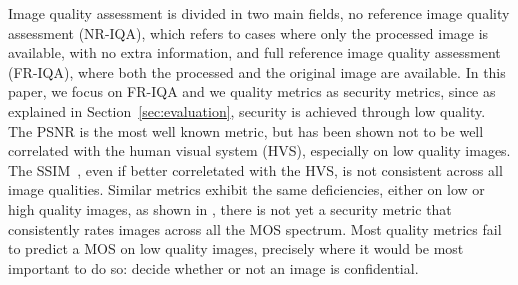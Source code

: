\documentclass{article}
\begin{document}
Image quality assessment is divided in two main fields, no reference image quality assessment (NR-IQA), which refers to cases where only the processed image is available, with no extra information, and full reference image quality assessment (FR-IQA), where both the processed and the original image are available. In this paper, we focus on FR-IQA and we quality metrics as security metrics, since as explained in Section~\ref{sec:evaluation}, security is achieved through low quality.
The PSNR is the most well known metric, but has been shown not to be well correlated with the human visual system (HVS), especially on low quality images. The SSIM~\cite{wang2004image}, even if better correletated with the HVS, is not consistent across all image qualities. Similar metrics \cite{sheikh2006image, yao2009visual, tong2010visual, sun2011objective} exhibit the same deficiencies, either on low or high quality images, as shown in \cite{hofbauer2016identifying}, there is not yet a security metric that consistently rates images across all the MOS spectrum. Most quality metrics fail to predict a MOS on low quality images, precisely where it would be most important to do so: decide whether or not an image is confidential.
\end{document}
